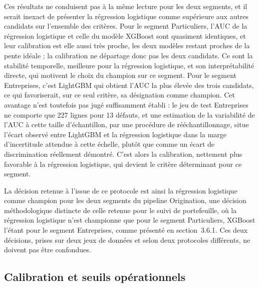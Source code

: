 Ces résultats ne conduisent pas à la même lecture pour les deux segments, et il serait inexact de présenter la régression logistique comme supérieure aux autres candidats sur l'ensemble des critères. Pour le segment Particuliers, l'AUC de la régression logistique et celle du modèle XGBoost sont quasiment identiques, et leur calibration est elle aussi très proche, les deux modèles restant proches de la pente idéale ; la calibration ne départage donc pas les deux candidats. Ce sont la stabilité temporelle, meilleure pour la régression logistique, et son interprétabilité directe, qui motivent le choix du champion sur ce segment. Pour le segment Entreprises, c'est LightGBM qui obtient l'AUC la plus élevée des trois candidats, ce qui favoriserait, sur ce seul critère, sa désignation comme champion. Cet avantage n'est toutefois pas jugé suffisamment établi : le jeu de test Entreprises ne comporte que 227 lignes pour 13 défauts, et une estimation de la variabilité de l'AUC à cette taille d'échantillon, par une procédure de rééchantillonnage, situe l'écart observé entre LightGBM et la régression logistique dans la marge d'incertitude attendue à cette échelle, plutôt que comme un écart de discrimination réellement démontré. C'est alors la calibration, nettement plus favorable à la régression logistique, qui devient le critère déterminant pour ce segment.

La décision retenue à l'issue de ce protocole est ainsi la régression logistique comme champion pour les deux segments du pipeline Origination, une décision méthodologique distincte de celle retenue pour le suivi de portefeuille, où la régression logistique n'est championne que pour le segment Particuliers, XGBoost l'étant pour le segment Entreprises, comme présenté en section~3.6.1. Ces deux décisions, prises sur deux jeux de données et selon deux protocoles différents, ne doivent pas être confondues.

\subsection{Calibration et seuils opérationnels}

